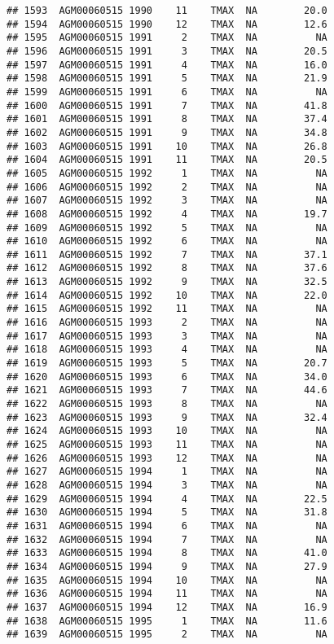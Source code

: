 \documentclass{article}\usepackage[]{graphicx}\usepackage[]{color}
\makeatletter
\newenvironment{kframe}{%
 \def\at@end@of@kframe{}%
 \ifinner\ifhmode%
  \def\at@end@of@kframe{\end{minipage}}%
  \begin{minipage}{\columnwidth}%
 \fi\fi%
 \def\FrameCommand##1{\hskip\@totalleftmargin \hskip-\fboxsep
 \colorbox{shadecolor}{##1}\hskip-\fboxsep
     \hskip-\linewidth \hskip-\@totalleftmargin \hskip\columnwidth}%
 \MakeFramed {\advance\hsize-\width
   \@totalleftmargin\z@ \linewidth\hsize
   \@setminipage}}%
 {\par\unskip\endMakeFramed%
 \at@end@of@kframe}
\newenvironment{knitrout}{}{} %
\makeatother
\begin{document}
\begin{knitrout}
\begin{kframe}
\begin{verbatim}
## 1593  AGM00060515 1990    11    TMAX  NA        20.0
## 1594  AGM00060515 1990    12    TMAX  NA        12.6
## 1595  AGM00060515 1991     2    TMAX  NA          NA
## 1596  AGM00060515 1991     3    TMAX  NA        20.5
## 1597  AGM00060515 1991     4    TMAX  NA        16.0
## 1598  AGM00060515 1991     5    TMAX  NA        21.9
## 1599  AGM00060515 1991     6    TMAX  NA          NA
## 1600  AGM00060515 1991     7    TMAX  NA        41.8
## 1601  AGM00060515 1991     8    TMAX  NA        37.4
## 1602  AGM00060515 1991     9    TMAX  NA        34.8
## 1603  AGM00060515 1991    10    TMAX  NA        26.8
## 1604  AGM00060515 1991    11    TMAX  NA        20.5
## 1605  AGM00060515 1992     1    TMAX  NA          NA
## 1606  AGM00060515 1992     2    TMAX  NA          NA
## 1607  AGM00060515 1992     3    TMAX  NA          NA
## 1608  AGM00060515 1992     4    TMAX  NA        19.7
## 1609  AGM00060515 1992     5    TMAX  NA          NA
## 1610  AGM00060515 1992     6    TMAX  NA          NA
## 1611  AGM00060515 1992     7    TMAX  NA        37.1
## 1612  AGM00060515 1992     8    TMAX  NA        37.6
## 1613  AGM00060515 1992     9    TMAX  NA        32.5
## 1614  AGM00060515 1992    10    TMAX  NA        22.0
## 1615  AGM00060515 1992    11    TMAX  NA          NA
## 1616  AGM00060515 1993     2    TMAX  NA          NA
## 1617  AGM00060515 1993     3    TMAX  NA          NA
## 1618  AGM00060515 1993     4    TMAX  NA          NA
## 1619  AGM00060515 1993     5    TMAX  NA        20.7
## 1620  AGM00060515 1993     6    TMAX  NA        34.0
## 1621  AGM00060515 1993     7    TMAX  NA        44.6
## 1622  AGM00060515 1993     8    TMAX  NA          NA
## 1623  AGM00060515 1993     9    TMAX  NA        32.4
## 1624  AGM00060515 1993    10    TMAX  NA          NA
## 1625  AGM00060515 1993    11    TMAX  NA          NA
## 1626  AGM00060515 1993    12    TMAX  NA          NA
## 1627  AGM00060515 1994     1    TMAX  NA          NA
## 1628  AGM00060515 1994     3    TMAX  NA          NA
## 1629  AGM00060515 1994     4    TMAX  NA        22.5
## 1630  AGM00060515 1994     5    TMAX  NA        31.8
## 1631  AGM00060515 1994     6    TMAX  NA          NA
## 1632  AGM00060515 1994     7    TMAX  NA          NA
## 1633  AGM00060515 1994     8    TMAX  NA        41.0
## 1634  AGM00060515 1994     9    TMAX  NA        27.9
## 1635  AGM00060515 1994    10    TMAX  NA          NA
## 1636  AGM00060515 1994    11    TMAX  NA          NA
## 1637  AGM00060515 1994    12    TMAX  NA        16.9
## 1638  AGM00060515 1995     1    TMAX  NA        11.6
## 1639  AGM00060515 1995     2    TMAX  NA          NA

\end{verbatim}
\end{kframe}
\end{knitrout}
\end{document}
